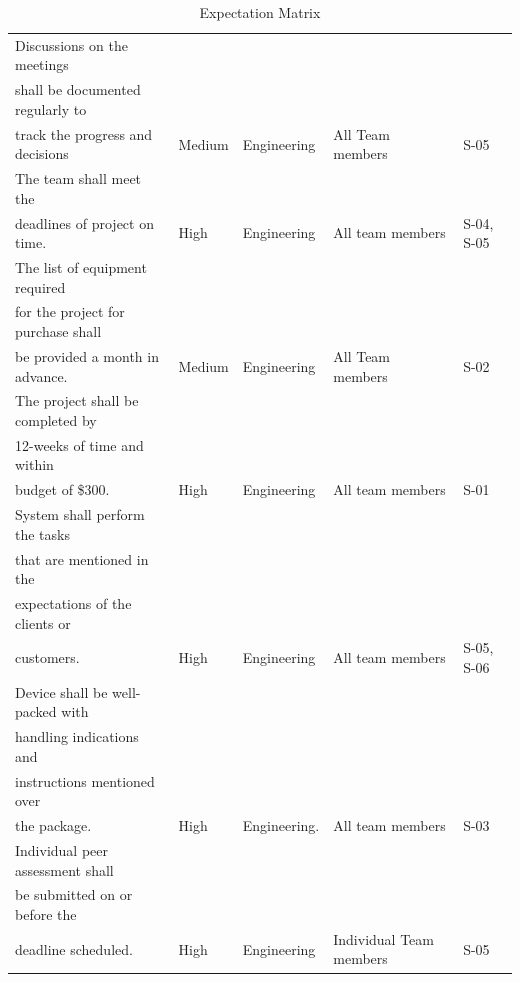 \documentclass[a4paper]{article}
\begin{document}
\begin{table}[!ht]
\caption{Expectation Matrix}
\label{2.2}
    \footnotesize
    \setlength\tabcolsep{3pt}
\begin{tabularx}{\linewidth}{@{} l
              >{\hsize}L
              >{\hsize}L
                            *{2}{L}
                @{}}
    \toprule
{}
    &   
        &   
            &   
                &               \\
    \midrule
Discussions on the meetings \\shall be documented regularly to \\track the progress and decisions
    & Medium 
        & Engineering
            & All Team members
                & S-05
                    \\
    \addlinespace
The team shall meet the \\deadlines of project on time.
    & High
        & Engineering 
            & All team members
                & S-04, S-05 
                    \\
    \addlinespace
The list of equipment required \\ for the project for purchase shall \\be provided a month in advance.
    & Medium 
        & Engineering
            & All Team members
                & S-02
                    \\
    \addlinespace
The project shall be completed  by \\12-weeks of time and within \\budget of \$300.  
    & High
        & Engineering
            & All team members
                & S-01
                    \\
    \addlinespace
System shall perform the tasks \\that are mentioned in the \\expectations of the clients or \\customers.   
    & High
        & Engineering
            & All team members
                & S-05, S-06
                   \\
    \addlinespace
Device shall be well-packed with \\handling indications and \\instructions mentioned over \\the package.   & High
        & Engineering.
            & All team members
                & S-03
                    \\
    \addlinespace
Individual peer assessment shall \\be submitted on or before the \\deadline scheduled.   
    & High
        & Engineering
            & Individual Team members
                & S-05
                    \\
    \bottomrule
\end{tabularx}
\end{table}
\end{document}
